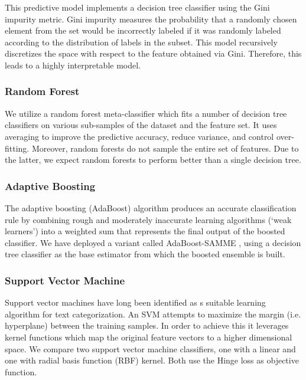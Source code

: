 \documentclass[letterpaper]{article}
\begin{document}
This predictive model implements a decision tree classifier using the Gini impurity metric. Gini impurity measures the probability that a randomly chosen element from the set would be incorrectly labeled if it was randomly labeled according to the distribution of labels in the subset. This model recursively discretizes the space with respect to the feature obtained via Gini. Therefore, this leads to a highly interpretable model.

\subsubsection{Random Forest}  \label{Random Forest}

We utilize a random forest meta-classifier which fits a number of decision tree classifiers on various sub-samples of the dataset and the feature set. It uses averaging to improve the predictive accuracy, reduce variance, and control over-fitting. Moreover, random forests do not sample the entire set of features. Due to the latter, we expect random forests to perform better than a single decision tree.

\subsubsection{Adaptive Boosting}  \label{Adaptive Boosting}

The adaptive boosting (AdaBoost) algorithm \cite{freund1997decision} produces an accurate classification rule by combining rough and moderately inaccurate learning algorithms (`weak learners') into a weighted sum that represents the final output of the boosted classifier. We have deployed a variant called AdaBoost-SAMME \cite{hastie2009multi}, using a decision tree classifier as the base estimator from which the boosted ensemble is built.

\subsubsection{Support Vector Machine}  \label{Support Vector Machine}

Support vector machines have long been identified as s suitable learning algorithm for text categorization\cite{yang1999evaluation}. An SVM attempts to maximize the margin (i.e. hyperplane) between the training samples. In order to achieve this it leverages kernel functions which map the original feature vectors to a higher dimensional space. We compare two support vector machine classifiers, one with a linear and one with radial basis function (RBF) kernel. Both use the Hinge loss as objective function.
\end{document}
